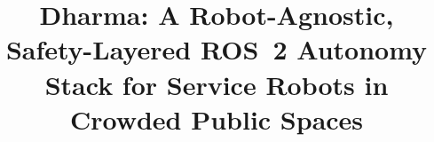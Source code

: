 \documentclass[conference]{IEEEtran}
\begin{document}
\title{Dharma: A Robot-Agnostic, Safety-Layered ROS~2 Autonomy Stack for Service Robots in
  Crowded Public Spaces}

\author{
}

\maketitle













\end{document}
